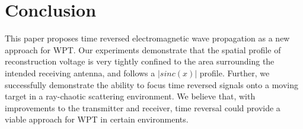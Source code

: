 \section{Conclusion}


This paper proposes time reversed electromagnetic wave propagation as a new
approach for WPT.
%
Our experiments demonstrate that the spatial profile of reconstruction voltage
is very tightly confined to the area surrounding the intended receiving antenna,
and follows a $\left|sinc(x)\right|$ profile.
%
Further, we successfully demonstrate the ability to focus time reversed signals
onto a moving target in a ray-chaotic scattering environment.
%
We believe that, with improvements to the transmitter and receiver, time reversal
could provide a viable approach for WPT in certain environments.
